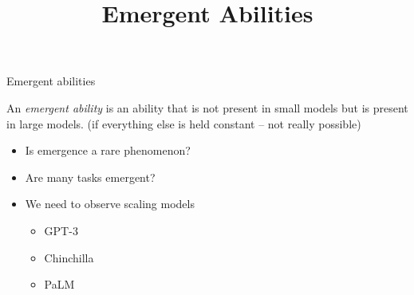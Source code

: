 



\newcommand{\learninggoals}{
\item illustrate emergent abilities that LLMs reveal when they are scaled up
\item discuss a counterargument for the concept of emergence
}

\def\myblue#1{\textcolor{texblue}{#1}}

\title{Emergent Abilities}
\date{}




\begin{vbframe}{Emergent abilities}

\vfill

An \textit{emergent ability} is an ability that is not
present in small models but is present in large models.
(if everything else is held constant -- not really possible)
\vskip3mm

\begin{itemize}
    \item Is emergence a rare phenomenon?
    \item Are many tasks emergent?
    \item We need to observe scaling models 
    \begin{itemize}
        \item GPT-3
        \item Chinchilla
        \item PaLM
    \end{itemize}
\end{itemize}

\vfill

\end{vbframe}


